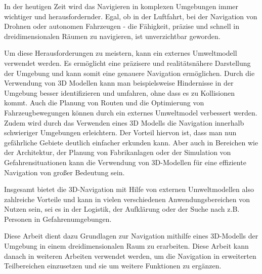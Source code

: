 

In der heutigen Zeit wird das Navigieren in komplexen Umgebungen immer wichtiger und herausfordernder. Egal, ob in der Luftfahrt, bei der Navigation von Drohnen oder autonomen Fahrzeugen - die Fähigkeit, präzise und schnell in dreidimensionalen Räumen zu navigieren, ist unverzichtbar geworden.

Um diese Herausforderungen zu meistern, kann ein externes Umweltmodell verwendet werden. Es ermöglicht eine präzisere und realitätsnähere Darstellung der Umgebung und kann somit eine genauere Navigation ermöglichen. Durch die Verwendung von 3D Modellen kann man beispielsweise Hindernisse in der Umgebung besser identifizieren und umfahren, ohne dass es zu Kollisionen kommt. Auch die Planung von Routen und die Optimierung von Fahrzeugbewegungen können durch ein externes Umweltmodel verbessert werden. Zudem wird durch das Verwenden eines 3D Modells die Navigation innerhalb schwieriger Umgebungen erleichtern. Der Vorteil hiervon ist, dass man nun gefährliche Gebiete deutlich einfacher erkunden kann. Aber auch in Bereichen wie der Architektur, der Planung von Fabrikanlagen oder der Simulation von Gefahrensituationen kann die Verwendung von 3D-Modellen für eine effiziente Navigation von großer Bedeutung sein.

Insgesamt bietet die 3D-Navigation mit Hilfe von externen Umweltmodellen also zahlreiche Vorteile und kann in vielen verschiedenen Anwendungsbereichen von Nutzen sein, sei es in der Logistik, der Aufklärung oder der Suche nach z.B. Personen in Gefahrenumgebungen.

Diese Arbeit dient dazu Grundlagen zur Navigation mithilfe eines 3D-Modells der Umgebung in einem dreidimensionalen Raum zu erarbeiten. Diese Arbeit kann danach in weiteren Arbeiten verwendet werden, um die Navigation in erweiterten Teilbereichen einzusetzen und sie um weitere Funktionen zu ergänzen.

